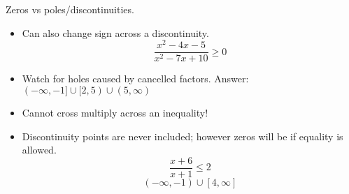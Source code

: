 \documentclass[letterpaper,12pt,fleqn]{article}
\begin{document}
Zeros vs poles/discontinuities.

\begin{itemize}
\item Can also change sign across a discontinuity.
\[\frac{x^2-4x-5}{x^2-7x+10}\ge0\]

\item Watch for holes caused by cancelled factors.
  Answer: $(-\infty,-1]\cup[2,5)\cup(5,\infty)$

\item Cannot cross multiply across an inequality!
\item Discontinuity points are never included; however zeros will be if
  equality is allowed.
  \[\frac{x+6}{x+1}\le2\]
  \[(-\infty,-1)\cup[4,\infty]\]
\end{itemize}
\end{document}
